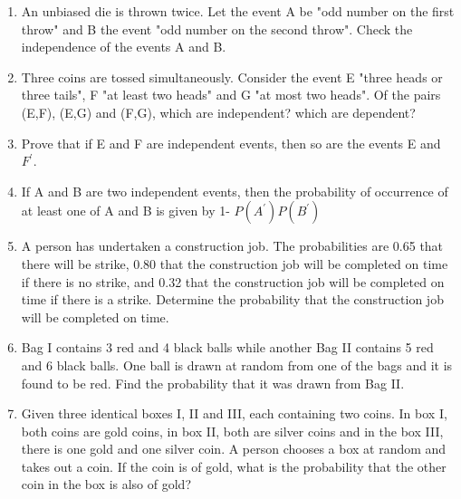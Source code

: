 \begin{enumerate}[label=\arabic*.,ref=\thesubsection.\theenumi]
\item An unbiased die is thrown twice. Let the event A be "odd number on the first throw" and B the event "odd number on the second throw". Check the independence of the events A and B.\\
\solution


\item Three coins are tossed simultaneously. Consider the event E "three heads or three tails", F "at least two heads" and G "at most two heads". Of the pairs (E,F), (E,G) and (F,G), which are independent? which are dependent?\\
\solution


\item Prove that if E and F are independent events, then so are the events E and $F^{'}$.\\
\solution


\item If A and B are two independent events, then the probability of occurrence of at least one of A and B is given by 1- $P(A^{'}) P(B^{'})$\\
\solution


\item A person has undertaken a construction job. The probabilities are 0.65 that there will be strike, 0.80 that the construction job will be completed on time if there is no strike, and 0.32 that the construction job will be completed on time if there is a strike. Determine the probability that the construction job will be completed on time.\\
\solution


\item Bag I contains 3 red and 4 black balls while another Bag II contains 5 red and 6 black balls. One ball is drawn at random from one of the bags and it is found to be red. Find the probability that it was drawn from Bag II.\\
\solution


\item Given three identical boxes I, II and III, each containing two coins. In box I, both coins are gold coins, in box II, both are silver coins and in the box III, there is one gold and one silver coin. A person chooses a box at random and takes out a coin. If the coin is of gold, what is the probability that the other coin in the box is also of gold?\\
\solution



\end{enumerate}
